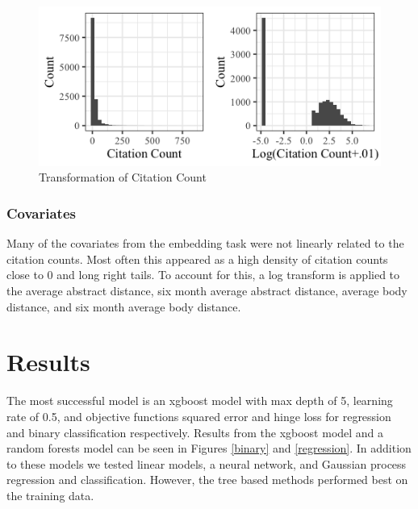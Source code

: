 \documentclass{article} %
\begin{document}
\begin{figure}[h]
\begin{center}
\includegraphics[scale=0.5]{../Figures/citation_hist.png} 
\end{center}
\caption{Transformation of Citation Count}
\end{figure}


\subsubsection{Covariates}
Many of the covariates from the embedding task were not linearly related to the citation counts. Most often this appeared as a high density of citation counts close to 0  and long right tails. To account for this, a log transform is applied to the average abstract distance, six month average abstract distance, average body distance, and six month average body distance.


\section{Results}

The most successful model is an xgboost model with max depth of 5, learning rate of 0.5, and objective functions squared error and hinge loss for regression and binary classification respectively. Results from the xgboost model and a random forests model can be seen in Figures \ref{binary} and \ref{regression}. In addition to these models we tested linear models, a neural network, and Gaussian process regression and classification. However, the tree based methods performed best on the training data.
\end{document}
